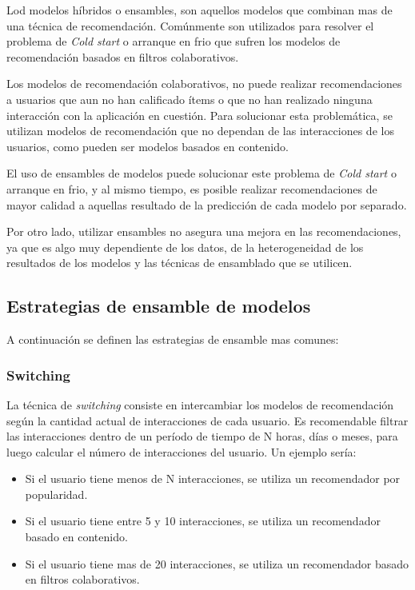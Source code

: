 \documentclass[11pt,a4paper,twoside]{thesis}
\begin{document}
Lod modelos híbridos o ensambles, son aquellos modelos que combinan mas de una
técnica de recomendación. Comúnmente son utilizados para resolver el problema
de \textit{Cold start} o arranque en frio que sufren los modelos de
recomendación basados en filtros colaborativos.

Los modelos de recomendación colaborativos, no puede realizar recomendaciones a
usuarios que aun no han calificado ítems o que no han realizado ninguna
interacción con la aplicación en cuestión. Para solucionar esta problemática,
se utilizan modelos de recomendación que no dependan de las interacciones de
los usuarios, como pueden ser modelos basados en contenido.

El uso de ensambles de modelos puede solucionar este problema de \textit{Cold
	start} o arranque en frio, y al mismo tiempo, es posible realizar
recomendaciones de mayor calidad a aquellas resultado de la predicción de cada
modelo por separado.

Por otro lado, utilizar ensambles no asegura una mejora en las recomendaciones,
ya que es algo muy dependiente de los datos, de la heterogeneidad de los
resultados de los modelos y las técnicas de ensamblado que se utilicen.

\subsection{Estrategias de ensamble de modelos}

A continuación se definen las estrategias de ensamble mas comunes:

\subsubsection{Switching}

La técnica de \textit{switching} consiste en intercambiar los modelos de
recomendación según la cantidad actual de interacciones de cada usuario. Es
recomendable filtrar las interacciones dentro de un período de tiempo de N
horas, días o meses, para luego calcular el número de interacciones del
usuario. Un ejemplo sería:

\begin{itemize}
	\item Si el usuario tiene menos de N interacciones, se utiliza un recomendador por
	      popularidad.
	\item Si el usuario tiene entre 5 y 10 interacciones, se utiliza un recomendador
	      basado en contenido.
	\item Si el usuario tiene mas de 20 interacciones, se utiliza un recomendador basado
	      en filtros colaborativos.
\end{itemize}
\end{document}
